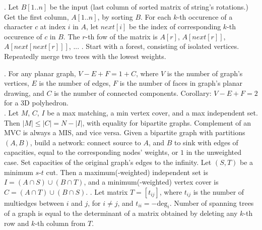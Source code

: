 


.
Let $B[1..n]$ be the input (last column of sorted matrix of string's rotations.)
Get the first column, $A[1..n]$, by sorting $B$.
For each $k$-th occurence of a character $c$ at index $i$ in $A$,
let $next[i]$ be the index of corresponding $k$-th occurence of $c$ in $B$.
The $r$-th fow of the matrix is $A[r]$, $A[next[r]]$, $A[next[next[r]]]$, ... \TopicBreak
{}.  Start with a forest, consisting of isolated
vertices.  Repeatedly merge two trees with the lowest weights.


. For any planar graph, $V - E + F = 1 + C$,
where $V$ is the number of graph's vertices, $E$ is the number of edges,
$F$ is the number of faces in graph's planar drawing, and $C$ is the number
of connected components.  Corollary: $V - E + F = 2$ for a 3D polyhedron. \\
.
Let $M$, $C$, $I$ be a max matching, a min vertex cover, and a max independent set.
Then $|M| \le |C| = N - |I|$, with equality for bipartite graphs.
Complement of an MVC is always a MIS, and vice versa.
Given a bipartite graph with partitions $(A, B)$, build a network:
connect source to $A$, and $B$ to sink with edges of capacities, equal to
the corresponding nodes' weights, or $1$ in the unweighted case.
Set capacities of the original graph's edges to the infinity.
Let $(S,T)$ be a minimum $s$-$t$ cut.
Then a maximum(-weighted) independent set is $I = (A \cap S) \cup (B \cap T)$,
and a minimum(-weighted) vertex cover is $C = (A \cap T) \cup (B \cap S)$. \TopicBreak
{}.
Let matrix $T = [t_{ij}]$, where $t_{ij}$ is the number of multiedges
between $i$ and $j$, for $i \ne j$, and $t_{ii} = -\mbox{deg}_i$.
Number of spanning trees of a graph is equal to the determinant of
a matrix obtained by deleting any $k$-th row and $k$-th column from $T$. \\
